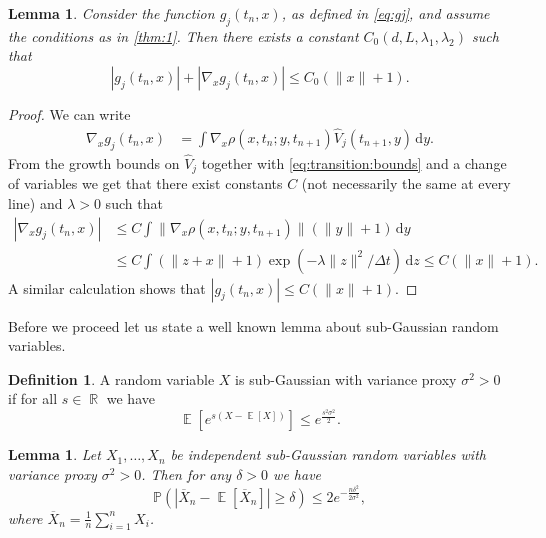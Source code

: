 \documentclass[11pt,reqno,a4paper]{amsart}
\newtheorem{lemma}[theorem]{Lemma}
\theoremstyle{definition}
\newtheorem{definition}[theorem]{Definition}
\numberwithin{equation}{section}
\newcommand{\diff}{\, \mathrm{d}}
\renewcommand{\P}{\mathbb{P}}
\DeclareMathOperator{\E}{\mathbb{E}}
\DeclareMathOperator{\R}{\mathbb{R}}
\DeclareMathOperator{\1}{\mathbbm{1}}
\begin{document}
\begin{lemma} \label{lemma:gj:lipschitz}
  Consider the function $g_j(t_{n},x)$, as defined in \cref{eq:gj}, and assume the conditions as in \cref{thm:1}.
  Then there exists a constant $C_0(d,L,\lambda_1,\lambda_2)$ such that
  \begin{equation*}
    |g_j(t_{n},x)| + |\nabla_x g_j(t_{n},x)| \leq C_0(\|x\|+1).
  \end{equation*}
\end{lemma}
\begin{proof}
  We can write
  \begin{align*}
    \nabla_x g_j(t_{n},x) & = \int \nabla_x \rho(x,t_n;y,t_{n+1}) \widehat{V}_j(t_{n+1},y) \diff y.
  \end{align*}
  From the growth bounds on $\widehat{V}_j$ together with \cref{eq:transition:bounds} and a change of variables we get that there exist constants $C$ (not necessarily the same at every line) and $\lambda > 0$ such that
  \begin{align*}
    \left | \nabla_x g_j(t_{n},x) \right |
     & \leq
    C \int \|\nabla_x \rho(x,t_n;y,t_{n+1})\| (\|y\|+1) \diff y
    \\
     & \leq
    C \int (\|z+x\|+1) \exp(-\lambda\|z\|^2/\Delta t) \diff z
    \leq
    C (\|x\|+1).
  \end{align*}
  A similar calculation shows that $|g_j(t_{n},x)| \leq C(\|x\|+1)$.
\end{proof}

Before we proceed let us state a well known lemma about sub-Gaussian random variables.
\begin{definition} \label{def:sub-gaussian}
  A random variable $X$ is sub-Gaussian with variance proxy $\sigma^2 > 0$ if for all $s \in \R$ we have
  \begin{equation}
    \E[e^{s (X-\E[X])}] \leq e^{\frac{s^2 \sigma^2}{2}}.
  \end{equation}
\end{definition}
\begin{lemma}\label{lem:concentration}
  Let $X_1,\ldots,X_n$ be independent sub-Gaussian random variables with variance proxy $\sigma^2 > 0$. Then for any $\delta > 0$ we have
  \begin{equation*}
    \P \left ( \left | \overline{X}_n - \E[\overline{X}_n] \right | \geq \delta \right ) \leq 2 e^{-\frac{n\delta^2}{2\sigma^2}},
  \end{equation*}
  where $\overline{X}_n = \frac{1}{n} \sum_{i=1}^n X_i$.
\end{lemma}
\end{document}
